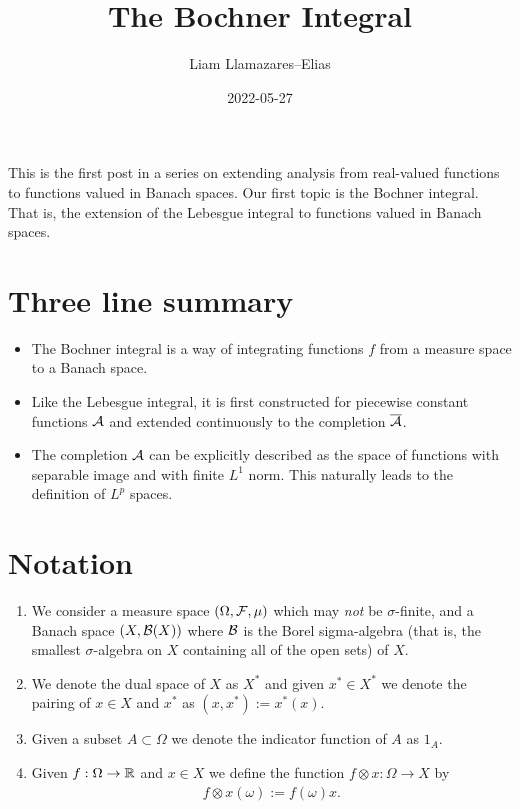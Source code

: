 \documentclass[
    a4paper,
    DIV=14,
    abstract=true,
    numbers=noenddot
]{scrartcl}
\begin{document}
\title{The Bochner Integral}
\author{Liam Llamazares--Elias}
\date{2022-05-27}
\maketitle
This is the first post in a series on extending analysis from real-valued functions to functions valued in Banach spaces. Our first topic is the Bochner integral. That is, the extension of the Lebesgue integral to functions valued in Banach spaces.
\section{Three line summary}
\begin{itemize}
	\item The Bochner integral is a way of integrating functions $f$ from a measure space to a Banach space.
	\item Like the Lebesgue integral, it is first constructed for piecewise constant functions $\mathcal{A}$ and extended continuously to the completion $\overline{\mathcal{A}}$.
	\item The completion $\mathcal{A}$ can be explicitly described as the space of functions with separable image and with finite $L^1$ norm. This naturally leads to the definition of $L^p$ spaces.
\end{itemize}
\section{Notation}
\begin{enumerate}
	\item We consider a measure space $(\Omega,\mathcal{F},\mu )$ which may \emph{not} be $\sigma $-finite, and a Banach space $(X,\mathcal{B}(X))$ where $\mathcal{B}$ is the Borel sigma-algebra (that is, the smallest $\sigma $-algebra on $X$ containing all of the open sets) of $X$.
	\item We denote the dual space of $X$ as $X^*$ and given $x^* \in X^*$ we denote the pairing of $x\in X$ and $x^*$ as $(x,x^*):= x^*(x)$.
	\item Given a subset $A\subset \Omega $ we denote the indicator function of $A$ as $1_A$.
	\item Given $f: \Omega \to \mathbb{R}$ and $x \in X$ we define the function $f\otimes x: \Omega \to X$ by
	      \begin{align*}
		      f \otimes x(\omega):= f(\omega)x.
	      \end{align*}

\end{enumerate}
\end{document}
